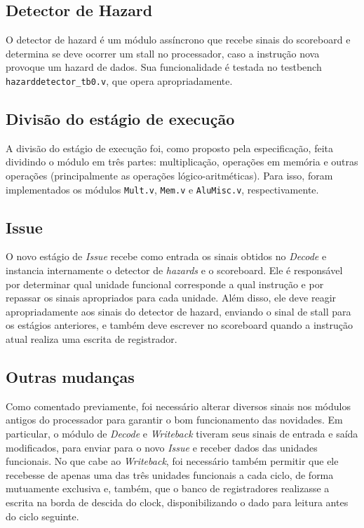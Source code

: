 \documentclass[12pt,a4paper]{article}
\numberwithin{equation}{section}
\begin{document}
\subsection{Detector de Hazard}

O detector de hazard é um módulo assíncrono que recebe sinais do scoreboard e determina se deve ocorrer um stall no processador, caso a instrução nova provoque um hazard de dados. Sua funcionalidade é testada no testbench \verb|hazarddetector_tb0.v|, que opera apropriadamente.

\subsection{Divisão do estágio de execução}

A divisão do estágio de execução foi, como proposto pela especificação, feita dividindo o módulo em três partes: multiplicação, operações em memória e outras operações (principalmente as operações lógico-aritméticas). Para isso, foram implementados os módulos \verb|Mult.v|, \verb|Mem.v| e \verb|AluMisc.v|, respectivamente.

\subsection{Issue}

O novo estágio de \emph{Issue} recebe como entrada os sinais obtidos no \emph{Decode} e instancia internamente o detector de \emph{hazards} e o scoreboard. Ele é responsável por determinar qual unidade funcional corresponde a qual instrução e por repassar os sinais apropriados para cada unidade. Além disso, ele deve reagir apropriadamente aos sinais do detector de hazard, enviando o sinal de stall para os estágios anteriores, e também deve escrever no scoreboard quando a instrução atual realiza uma escrita de registrador.

\subsection {Outras mudanças}

Como comentado previamente, foi necessário alterar diversos sinais nos módulos antigos do processador para garantir o bom funcionamento das novidades. Em particular, o módulo de \emph{Decode} e \emph{Writeback} tiveram seus sinais de entrada e saída modificados, para enviar para o novo \emph{Issue} e receber dados das unidades funcionais. No que cabe ao \emph{Writeback}, foi necessário também permitir que ele recebesse de apenas uma das três unidades funcionais a cada ciclo, de forma mutuamente exclusiva e, também, que o banco de registradores realizasse a escrita na borda de descida do clock, disponibilizando o dado para leitura antes do ciclo seguinte.
\end{document}
